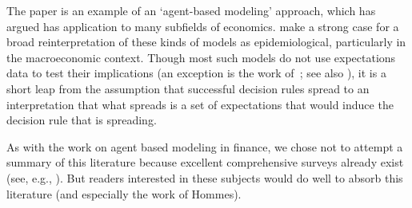 The paper is an example of an `agent-based modeling' approach, which \cite{tesfatsion2006agent} has argued has application to many subfields of economics.  \cite{haldane_drawing_2019} make a strong case for a broad reinterpretation of these kinds of models as epidemiological, particularly in the macroeconomic context.  Though most such models do not use expectations data to test their implications (an exception is the work of~\cite{hommes2006heterogeneous}; see also \cite{branchHeteroExp}), it is a short leap from the assumption that successful decision rules spread to an interpretation that what spreads is a set of expectations that would induce the decision rule that is spreading.

As with the work on agent based modeling in finance, we chose not to attempt a summary of this literature because excellent comprehensive surveys already exist (see, e.g., \cite{ddAgentBasedMacro}).  But readers interested in these subjects would do well to absorb this literature (and especially the work of Hommes).

